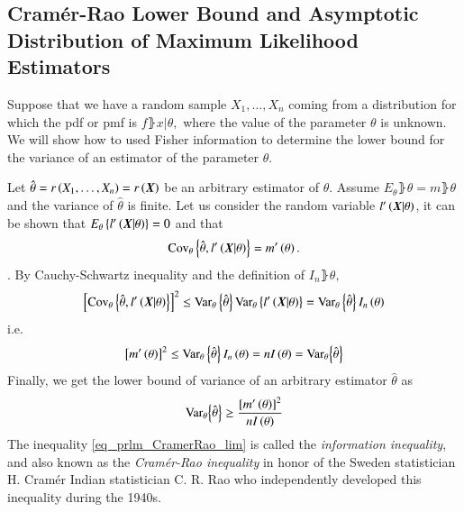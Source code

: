 \subsection{Cram\'er-Rao Lower Bound and Asymptotic Distribution of Maximum Likelihood Estimators}
Suppose that we have a random sample $X_{1},\dots,X_{n}$ coming from a distribution for which the pdf or pmf is $f\rBrace{x|\theta},$ where the value of the parameter $\theta$ is unknown. 
We will show how to used Fisher information to determine the lower bound for the variance of an estimator of the parameter $\theta$.
\par
Let $\hat{\theta}=r\left({X_{1},\dots,X_{n}}\right)=r\left({\boldsymbol{X}}\right)$ be an arbitrary estimator of $\theta$.
Assume $E_{\theta}\rBrace{\hat{\theta}}=m\rBrace{\theta}$ and the variance of $\hat{\theta}$ is finite.
Let us consider the random variable $l^{\prime}\left({\boldsymbol{X}|\theta}\right)$, it can be shown that $E_{\theta}\left\{{l^{\prime}\left({\boldsymbol{X}|\theta}\right)}\right\}=0$ and that
\begin{equation}
\label{eq_prlm_covThetaLTag}
    \text{Cov}_{\theta}\left\{{\hat{\theta},l^{\prime}\left({\boldsymbol{X}|\theta}\right)}\right\}=m^{\prime}\left({\theta}\right).
\end{equation}.
By Cauchy-Schwartz inequality and the definition of $I_{n}\rBrace{\theta},$
\begin{equation*}
    \left[{\text{Cov}_{\theta}\left\{{\hat{\theta},l^{\prime}\left({\boldsymbol{X}|\theta}\right)}\right\}}\right]^{2}\leq{}\text{Var}_{\theta}\left\{{\hat{\theta}}\right\}\text{Var}_{\theta}\left\{{l^{\prime}\left({\boldsymbol{X}|\theta}\right)}\right\}=\text{Var}_{\theta}\left\{{\hat{\theta}}\right\}I_{n}\left({\theta}\right)
\end{equation*}
i.e.
\begin{equation*}
    \left[{m^{\prime}\left({\theta}\right)}\right]^{2}\leq{}\text{Var}_{\theta}\left\{{\hat{\theta}}\right\}I_{n}\left({\theta}\right)=nI\left({\theta}\right)=\text{Var}_{\theta}{\left\{{\hat{\theta}}\right\}}
\end{equation*}
Finally, we get the lower bound of variance of an arbitrary estimator $\hat{\theta}$ as
\begin{equation}
\label{eq_prlm_CramerRao_lim}
    \text{Var}_{\theta}{\left\{{\hat{\theta}}\right\}}\geq{}\frac{\left[{m^{\prime}\left({\theta}\right)}\right]^{2}}{nI\left({\theta}\right)}
\end{equation}
The inequality \eqref{eq_prlm_CramerRao_lim} is called the \emph{information inequality}, and also known as the \emph{Cram\'er-Rao inequality} in honor of the Sweden statistician H. Cram\'er Indian statistician C. R. Rao who independently developed this inequality during the 1940s. 
